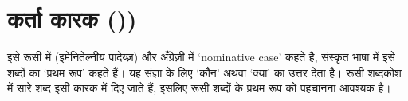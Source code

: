 \section{कर्ता कारक ())}\label{sec:case-nominative}
इसे रूसी में  (इमेनितेल्नीय पादेय्ज़) और अँग्रेज़ी में `nominative case' कहते है, संस्कृत भाषा में इसे शब्दों का `प्रथम रूप' कहते हैं।
यह संज्ञा के लिए `कौन' अथवा `क्या' का उत्तर देता है। रूसी शब्दकोश में सारे शब्द इसी कारक में दिए जाते हैं, इसलिए रूसी शब्दों के प्रथम रूप को पहचानना आवश्यक है।



